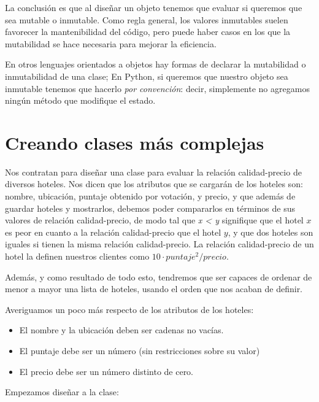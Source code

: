 La conclusión es que al diseñar un objeto tenemos que evaluar si queremos
que sea mutable o inmutable. Como regla general, los valores inmutables suelen favorecer la
mantenibilidad del código, pero puede haber casos en los que la mutabilidad se
hace necesaria para mejorar la eficiencia.

En otros lenguajes orientados a objetos hay formas de declarar la mutabilidad o
inmutabilidad de una clase; En Python, si queremos que nuestro objeto sea
inmutable tenemos que hacerlo \emph{por convención}: decir, simplemente no
agregamos ningún método que modifique el estado.

\section{Creando clases más complejas}

Nos contratan para diseñar una clase para evaluar la relación calidad-precio de
diversos hoteles.  Nos dicen que los atributos que se cargarán de los hoteles
son: nombre, ubicación, puntaje obtenido por votación, y precio, y que además
de guardar hoteles y mostrarlos, debemos poder compararlos en términos de
sus valores de relación calidad-precio, de modo tal que \emph{x < y} signifique
que el hotel $x$ es peor en cuanto a la relación calidad-precio que el hotel
$y$, y que dos hoteles son iguales si tienen la misma relación calidad-precio.
La relación calidad-precio de un hotel la definen nuestros clientes como
$10 \cdot puntaje^2 / precio$.

Además, y como resultado de todo esto, tendremos que ser capaces
de ordenar de menor a mayor una lista de hoteles, usando el orden que nos
acaban de definir.

Averiguamos un poco más respecto de los atributos de los hoteles:

\begin{itemize}
\item El nombre y la ubicación deben ser cadenas no vacías.
\item El puntaje debe ser un número (sin restricciones sobre su valor)
\item El precio debe ser un número distinto de cero.
\end{itemize}

Empezamos diseñar a la clase:

